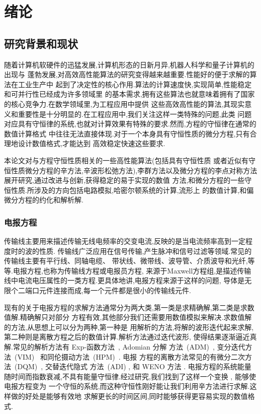 \chapter{绪论}

\section{研究背景和现状}

随着计算机软硬件的迅猛发展,计算机形态的日新月异,机器人科学和量子计算机的出现与
蓬勃发展,对高效高性能算法的研究变得越来越重要.性能好的便于求解的算法在工业生产中
起到了决定性的核心作用.算法的计算速度快,实现简单,性能稳定和可并行性已经成为许多领域里
的基本需求,拥有这些算法也就意味着拥有了国家的核心竞争力.在数学领域里,为工程应用中提供
这些高效高性能的算法,其现实意义和重要性是十分明显的.在工程应用中,我们关注这样一类特殊的问题,此类
问题对应具有守恒律的系统,也就对计算效果有特殊的要求.然而,方程的守恒律在通常的数值计算格式
中往往无法直接体现.对于一个本身具有守恒性质的微分方程,只有合理地设计数值格式,才能达到
高效稳定快速这些要求.

本论文对与方程守恒性质相关的一些高性能算法(包括具有守恒性质
或者近似有守恒性质微分方程的辛方法,辛波形松弛方法),李群方法以及微分方程的李点对称方法展开研究,通过改进与创新,获得稳定的易于实现的数值
方法,和微分方程的一些守恒性质.所涉及的方向包括电路模拟,哈密尔顿系统的计算,流形上
的数值计算,和偏微分方程的约化和解析解.

\subsection{电报方程}

传输线主要用来描述传输无线电频率的交变电流,反映的是当电流频率高到一定程度时的波的性质.
传输线广泛应用在信号传输,产生脉冲和信号过滤等领域.常见的传输线主要有平行线、同轴电缆、
带状线、微带线、波导管、介质波导和光纤,等等.电报方程,也称为传输线方程或电报员方程,
来源于Maxwell方程组,是描述传输线中电流电压属性的一类方程.更具体地讲,电报方程来源于这样的问题,
导体是无限个二端口元件连接而成,每一个元件都是很小的传输线元件.

现有的关于电报方程的求解方法通常分为两大类,第一类是求精确解,第二类是求数值解.精确解只对部分
方程有效,其他部分我们还需要用数值模拟来解决.求数值解的方法,从思想上可以分为两种,第一种是
用解析的方法,将解的波形迭代起来求解,第二种则是离散方程之后的数值计算.解析方法通过迭代波形,
使得结果逐渐逼近真解.常见的解析方法有 Exp-函数方法~\cite{naher2011exp}, Adomian 分解
方法~(ADM)~\cite{adomian1988areview,sheikholeslami2012analytical}, 变分迭代方
法~(VIM)~\cite{wu2013variational} 和同伦摄动方法~(HPM)~\cite{sheikholeslami2012homotopy}. 电报
方程的离散方法常见的有微分二次方法~(DQM)~\cite{jiwari2012numerical}, 交替迭代隐式
方法~(ADI) \cite{cui2013convergence}, 和 WENO 方法 \cite{borges2008improved,shen2014improvement}.
电报方程的系统能量随时间而指数衰减,不具有能量守恒律.经过研究,我们找到了这样一个变换 \cite{polyanin2001handbook}, 能够使电报方程变为
一个守恒的系统,而这种守恒性刚好能让我们利用辛方法进行求解.这样做的好处是能够有效地
求解更长的时间区间,同时能够获得更容易实现的数值格式.

